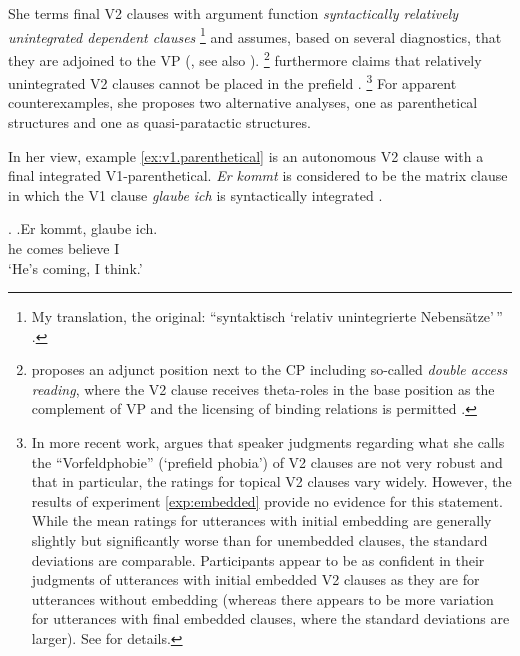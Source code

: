 She terms final V2 clauses with argument  function \textit{syntactically relatively unintegrated dependent clauses}%
\footnote{My translation, the original: ``syntaktisch `relativ unintegrierte Nebensätze'\,'' \citep[121]{reis1997}.}
%
\citep[121]{reis1997} and assumes, based on several diagnostics, that they are adjoined to the VP  (\cite[138]{reis1997}, see also \cite{truckenbrodt2006}).%
\footnote{\citet{meinunger2004, meinunger2006} proposes an adjunct  position next to the CP  including so-called \textit{double access reading}, where the V2 clause receives theta-roles in the base position as the complement of VP  and the licensing of binding  relations is permitted \citep[481]{meinunger2006}.}
%
\citet[139]{reis1997} furthermore claims that relatively unintegrated V2 clauses cannot be placed in the prefield \citep[see also][]{frank2000, truckenbrodt2006, freywald2009, freywald2013}.%
\footnote{In more recent work, \citet[342, footnote 16]{freywald2016} argues that speaker judgments regarding what she calls the ``Vorfeldphobie'' (`prefield phobia') of V2 clauses are not very robust and that in particular, the ratings for topical V2 clauses vary widely.
However, the results of experiment \ref*{exp:embedded} provide no evidence for this statement.
While the mean ratings for utterances with initial embedding are generally slightly but significantly worse than for unembedded clauses, the standard deviations are comparable.
Participants appear to be as confident in their judgments of utterances with initial embedded V2 clauses as they are for utterances without embedding (whereas there appears to be more variation for utterances with final embedded clauses, where the standard deviations are larger).
See  for details.
}
%
For apparent counterexamples, she proposes two alternative analyses, one as parenthetical structures and one as quasi-paratactic structures.

In her view, example \ref{ex:v1.parenthetical} is an autonomous V2 clause with a final integrated V1-parenthetical.
\textit{Er kommt} is considered to be the matrix clause in which the V1 clause \textit{glaube ich} is syntactically integrated \citep[139, footnote 23]{reis1997}.

\ex.
\ag.\label{ex:v1.parenthetical}Er kommt, glaube ich.\\
he comes believe I\\
`He's coming, I think.' \citep[139, footnote 23]{reis1997}

